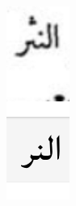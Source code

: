\begin{figure}[!ht]
	\begin{subfigure}[b]{0.3\linewidth}
	\centering
	\includegraphics[width=\linewidth]{images/image26.png}

\end{subfigure}
\end{figure}
